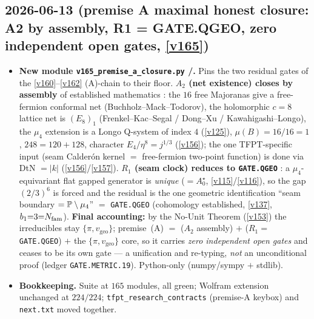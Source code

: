 \subsection*{2026-06-13 (premise A maximal honest closure: A2 by assembly, R1 = GATE.QGEO, zero independent open gates, \vref{v165})}
\begin{itemize}
\item \textbf{New module \texttt{v165\_premise\_a\_closure.py} \mC/\mO.} Pins the two residual gates of the
  \vref{v160}--\vref{v162} (A)-chain to their floor. \textbf{$A_2$ (net existence) closes by assembly} of
  established mathematics \mC: the $16$ free Majoranas give a free-fermion conformal net
  (Buchholz--Mack--Todorov), the holomorphic $c{=}8$ lattice net is $(E_8)_1$ (Frenkel--Kac--Segal /
  Dong--Xu / Kawahigashi--Longo), the $\mu_4$ extension is a Longo Q-system of index $4$ (\vref{v125}),
  $\mu(B){=}16/16{=}1$, $248{=}120{+}128$, character $E_4/\eta^8{=}j^{1/3}$ (\vref{v156}); the one
  TFPT-specific input (seam Calder\'on kernel $=$ free-fermion two-point function) is done via DtN $=|k|$
  (\vref{v156}/\vref{v157}). \textbf{$R_1$ (seam clock) reduces to \texttt{GATE.QGEO}} \mC: a
  $\mu_4$-equivariant flat gapped generator is \emph{unique} ($=A_0^\star$, \vref{v115}/\vref{v116}), so the
  gap $(2/3)^6$ is forced and the residual is the one geometric identification ``seam boundary $=
  \mathbb{P}\setminus\mu_4$'' $=$ \texttt{GATE.QGEO} (cohomology established, \vref{v137}, $b_1{=}3{=}N_{\mathrm{fam}}$).
  \textbf{Final accounting:} by the No-Unit Theorem (\vref{v153}) the irreducibles stay $\{\pi,
  v_{\mathrm{geo}}\}$; premise~(A) $=$ ($A_2$ assembly) $+$ ($R_1{=}$\texttt{GATE.QGEO}) $+$ the
  $\{\pi,v_{\mathrm{geo}}\}$ core, so it carries \emph{zero independent open gates} and ceases to be its own
  gate --- a unification and re-typing, \emph{not} an unconditional proof (ledger \texttt{GATE.METRIC.19}).
  Python-only (numpy/sympy $+$ stdlib).
\item \textbf{Bookkeeping.} Suite at $165$ modules, all green; Wolfram extension unchanged at $224/224$;
  \texttt{tfpt\_research\_contracts} (premise-A keybox) and \texttt{next.txt} moved together.
\end{itemize}

